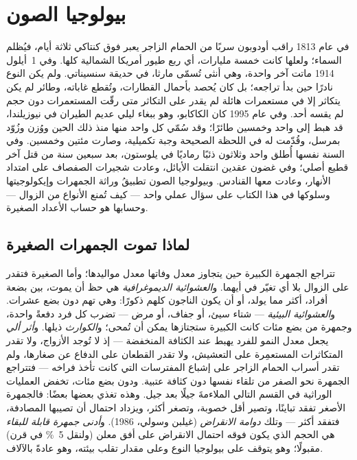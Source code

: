 \chapter{بيولوجيا الصون}\label{ch:b3:conservation-biology}

في عام 1813 راقب أودوبون سربًا من الحمام الزاجر يعبر فوق
كنتاكي ثلاثة أيام، فيُظلم السماء؛ ولعلها كانت خمسة
مليارات، أي ربع طيور أمريكا الشمالية كلها. وفي
1~أيلول 1914 ماتت آخر واحدة، وهي أنثى تُسمّى مارثا، في حديقة
سنسيناتي. ولم يكن النوع نادرًا حين بدأ تراجعه؛ بل
كان يُحصد بأحمال القطارات، وتُقطع غاباته، وطائر
لم يكن يتكاثر إلا في مستعمرات هائلة لم يقدر على التكاثر متى
رقّت المستعمرات دون حجم لم يقسه أحد. وفي عام 1995 كان الكاكابو،
وهو ببغاء ليلي عديم الطيران في نيوزيلندا، قد هبط إلى واحد
وخمسين طائرًا؛ وقد سُمّي كل واحد منها منذ ذلك الحين ووُزن
وزُوّد بمرسل، وقُدّمت له في اللحظة الصحيحة وجبة تكميلية،
وصارت مئتين وخمسين. وفي السنة نفسها أُطلق واحد وثلاثون ذئبًا
رماديًا في يلوستون، بعد سبعين سنة من قتل آخر قطيع
أصلي؛ وفي غضون عقدين انتقلت الأيائل، وعادت
شجيرات الصفصاف على امتداد الأنهار، وعادت معها القنادس.
وبيولوجيا الصون تطبيقُ وراثة الجمهرات وإيكولوجيتها وسلوكها
في هذا الكتاب على سؤال عملي واحد --- كيف
تُمنع الأنواع من الزوال --- وحسابها هو حساب الأعداد الصغيرة.

\section{لماذا تموت الجمهرات الصغيرة}

\begin{definition}\label{def:b3:conservation-biology:small}
تتراجع الجمهرة الكبيرة حين يتجاوز معدل وفاتها معدل مواليدها؛
وأما الصغيرة فتقدر على الزوال بلا أي تغيّر في أيهما.
و\emph{العشوائية الديموغرافية} هي حظ أن يموت، بين بضعة
أفراد، أكثر مما يولد، أو أن يكون الناجون كلهم
ذكورًا: وهي تهم دون بضع عشرات. و\emph{العشوائية البيئية}
--- شتاء سيئ، أو جفاف، أو مرض --- تضرب كل فرد دفعةً
واحدة، وجمهرة من بضع مئات كانت الكبيرة ستجتازها
يمكن أن تُمحى؛ و\emph{الكوارث} ذيلها. و\emph{أثر
ألي} يجعل معدل النمو للفرد يهبط عند الكثافة المنخفضة ---
إذ لا تُوجد الأزواج، ولا تقدر المتكاثرات المستعمِرة على
التعشيش، ولا تقدر القطعان على الدفاع عن صغارها، ولم تقدر
أسراب الحمام الزاجر على إشباع المفترسات التي كانت تأخذ فراخه
--- فتتراجع الجمهرة نحو الصفر من تلقاء نفسها دون كثافة عتبية.
ودون بضع مئات، تخفض العمليات الوراثية في القسم التالي
الملاءمةَ جيلًا بعد جيل. وهذه تغذي بعضها بعضًا: فالجمهرة
الأصغر تفقد تباينًا، وتصير أقل خصوبة، وتصغر أكثر، ويزداد
احتمال أن تصيبها المصادفة، فتفقد أكثر --- وتلك \emph{دوامة
الانقراض} (غيلبن وسولي، 1986). و\emph{أدنى جمهرة قابلة للبقاء}
هي الحجم الذي يكون فوقه احتمال الانقراض على أفق معلن
(ولنقل \qty{5}{\%} في قرن) مقبولًا؛ وهو يتوقف على بيولوجيا
النوع وعلى مقدار تقلب بيئته، وهو عادةً بالآلاف.
\end{definition}

